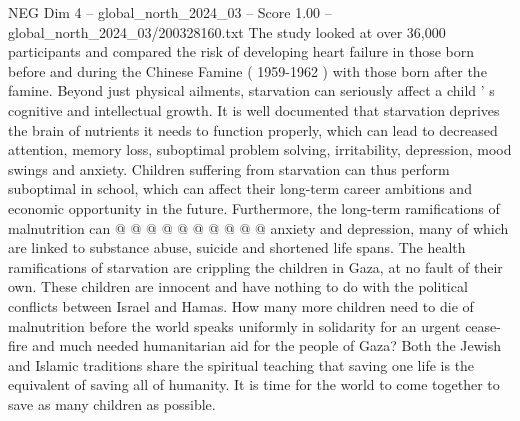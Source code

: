 \begin{textsample}{NEG Dim 4 – global\_north\_2024\_03 – Score 1.00 – global\_north\_2024\_03/200328160.txt}
The study looked at over 36,000 participants and compared the risk of developing heart failure in those born before and during the Chinese Famine ( 1959-1962 ) with those born after the famine.
Beyond just physical ailments, starvation can seriously affect a child ' s cognitive and intellectual growth.
It is well documented that starvation deprives the brain of nutrients it needs to function properly, which can lead to decreased attention, memory loss, suboptimal problem solving, irritability, depression, mood swings and anxiety.
Children suffering from starvation can thus perform suboptimal in school, which can affect their long-term career ambitions and economic opportunity in the future.
Furthermore, the long-term ramifications of malnutrition can @ @ @ @ @ @ @ @ @ @ anxiety and depression, many of which are linked to substance abuse, suicide and shortened life spans.
The health ramifications of starvation are crippling the children in Gaza, at no fault of their own.
These children are innocent and have nothing to do with the political conflicts between Israel and Hamas.
How many more children need to die of malnutrition before the world speaks uniformly in solidarity for an urgent cease-fire and much needed humanitarian aid for the people of Gaza?
Both the Jewish and Islamic traditions share the spiritual teaching that saving one life is the equivalent of saving all of humanity.
It is time for the world to come together to save as many children as possible.

\end{textsample}
